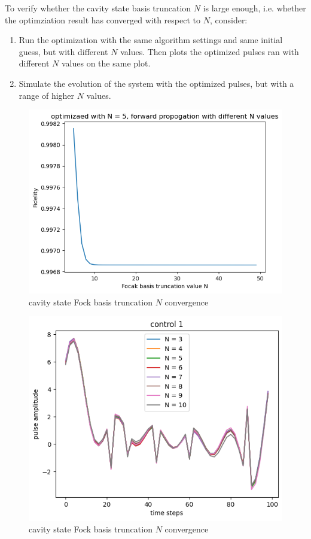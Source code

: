 \documentclass[12pt]{article}
\begin{document}
To verify whether the cavity state basis truncation $N$ is large enough, i.e. 
whether the optimziation result has converged with respect to $N$, consider: 
\begin{enumerate}
    \item Run the optimization with the same algorithm settings and same initial guess, but with different $N$ values. 
        Then plots the optimized pulses ran with different $N$ values on the same plot. 
    \item Simulate the evolution of the system with the optimized pulses, but with a range of higher $N$ values. 
\end{enumerate}

\begin{figure}[H]
    \centering
    \includegraphics[width=0.95\linewidth]{vac2coherent_N_convergence.png}
    \caption{cavity state Fock basis truncation $N$ convergence}
    \label{fig:vac2coherent_N_convergence}
\end{figure}

\begin{figure}[H]
    \centering
    \includegraphics[width=0.95\linewidth]{check_convergence_control1.png}
    \caption{cavity state Fock basis truncation $N$ convergence}
    \label{fig:check_convergence_control1}
\end{figure}
\end{document}
